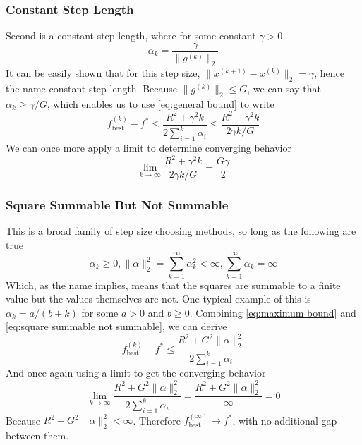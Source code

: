 \documentclass[journal,onecolumn]{IEEEtran}
\DeclareMathOperator{\best}{best}
\begin{document}
\subsubsection{Constant Step Length}\label{sec:constant step length}
Second is a constant step length, where for some constant \(\gamma > 0\)
\begin{equation}\label{eq:constant step length}
\alpha_k = \frac{\gamma}{\|g^{(k)}\|_2}
\end{equation}
It can be easily shown that for this step size, \(\|x^{(k+1)}-x^{(k)}\|_2 = \gamma\), hence the name constant step length. Because \(\|g^{(k)}\|_2 \leq G\), we can say that \(\alpha_k \geq \gamma/G\), which enables us to use \eqref{eq:general bound} to write
\begin{equation}\label{eq:constant step length bound}
f^{(k)}_{\best}-f^* \leq \frac{R^2  + \gamma^2 k}{2\sum^k_{i=1}\alpha_i} \leq \frac{R^2  + \gamma^2 k}{2\gamma k / G}
\end{equation}
We can once more apply a limit to determine converging behavior
\begin{equation}\label{eq:constant step length convergence}
\lim_{k \rightarrow \infty} \frac{R^2  + \gamma^2 k}{2\gamma k / G} = \frac{G \gamma}{2}
\end{equation}

\subsubsection{Square Summable But Not Summable}\label{sec:square summable not summable}
This is a broad family of step size choosing methods, so long as the following are true
\begin{equation}\label{eq:square summable not summable}
\alpha_k \geq 0, \|\alpha\|^2_2= \sum_{k=1}^{\infty} \alpha_k^2 < \infty, \sum_{k=1}^{\infty} \alpha_k = \infty
\end{equation}
Which, as the name implies, means that the squares are summable to a finite value but the values themselves are not. One typical example of this is \(\alpha_k = a/(b+k)\) for some \(a > 0\) and \(b \geq 0\). Combining \eqref{eq:maximum bound} and \eqref{eq:square summable not summable}, we can derive
\begin{equation}\label{eq:square summable not summable bound}
f^{(k)}_{\best}-f^* \leq \frac{R^2  + G^2 \|\alpha\|_2^2}{2\sum^k_{i=1}\alpha_i}
\end{equation}
And once again using a limit to get the converging behavior
\begin{equation}\label{eq:square summable not summable convergence}
\lim_{k \rightarrow \infty} \frac{R^2  + G^2 \|\alpha\|_2^2}{2 \sum^k_{i=1}\alpha_i} = \frac{R^2  + G^2 \|\alpha\|_2^2}{\infty} = 0
\end{equation}
Because \(R^2 + G^2\|\alpha\|^2_2 < \infty\). Therefore \(f^{(\infty)}_{\best} \rightarrow f^*\), with no additional gap between them.
\end{document}
